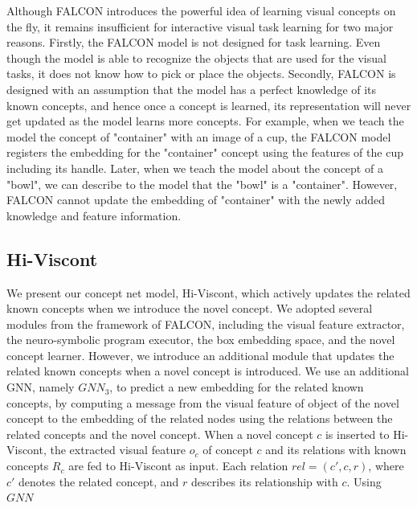 Although FALCON introduces the powerful idea of learning visual concepts on the fly, it remains insufficient for interactive visual task learning for two major reasons.
Firstly, the FALCON model is not designed for task learning. Even though the model is able to recognize the objects that are used for the visual tasks, it does not know how to pick or place the objects.
Secondly, FALCON is designed with an assumption that the model has a perfect knowledge of its known concepts, and hence once a concept is learned, its representation will never get updated as the model learns more concepts.
For example, when we teach the model the concept of "container" with an image of a cup, the FALCON model registers the embedding for the "container" concept using the features of the cup including its handle. 
Later, when we teach the model about the concept of a "bowl", we can describe to the model that the "bowl" is a "container". However, FALCON cannot update the embedding of "container" with the newly added knowledge and feature information.

\subsection{Hi-Viscont}
We present our concept net model, Hi-Viscont, which actively updates the related known concepts when we introduce the novel concept.
We adopted several modules from the framework of FALCON, including the visual feature extractor, the neuro-symbolic program executor, the box embedding space, and the novel concept learner.
However, we introduce an additional module that updates the related known concepts when a novel concept is introduced. 
We use an additional GNN, namely $GNN_3$, to predict a new embedding for the related known concepts, by computing a message from the visual feature of object of the novel concept to the embedding of the related nodes using the relations between the related concepts and the novel concept.
When a novel concept $c$ is inserted to Hi-Viscont, the extracted visual feature $o_c$ of concept $c$ and its relations with known concepts $R_c$ are fed to Hi-Viscont as input. 
Each relation $rel=(c',c, r)$, where $c'$ denotes the related concept, and $r$ describes its relationship with $c$.
Using $GNN$




